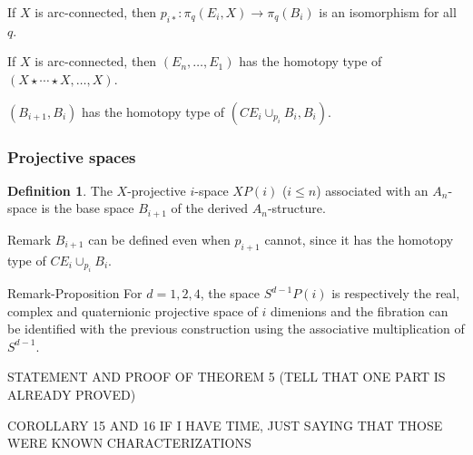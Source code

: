 \documentclass{beamer}
\theoremstyle{definition}
\newtheorem{defi}{Definition}
\begin{document}
\begin{frame}
\begin{theorem}
If $X$ is arc-connected, then $p_{i*}:\pi_q(E_i,X)\to \pi_q(B_i)$ is an isomorphism for all $q$. %
\end{theorem}\pause

\begin{theorem}
If $X$ is arc-connected, then $(E_n, \dots, E_1)$ has the homotopy type of $(X\star\cdots\star X,\dots, X)$. %
\end{theorem}\pause

\begin{theorem}
$(B_{i+1},B_i)$ has the homotopy type of $(CE_i\cup_{p_i}B_i,B_i)$. %
\end{theorem}
\end{frame}
\begin{frame}
\frametitle{Projective spaces}
\begin{defi}
The $X$-projective $i$-space $XP(i)$ ($i\leq n$) associated with an $A_n$-space is the base space $B_{i+1}$ of the derived $A_n$-structure.
\end{defi}\pause
\begin{block}{Remark}
$B_{i+1}$ can be defined even when $p_{i+1}$ cannot, since it has the homotopy type of $CE_i\cup_{p_i}B_i$.
\end{block}\pause
\begin{block}{Remark-Proposition}%
For $d=1,2,4$, the space $S^{d-1}P(i)$ is respectively the real, complex and quaternionic projective space of $i$ dimenions and the fibration can be identified with the previous construction using the associative multiplication of $S^{d-1}$.
\end{block}
\end{frame}


\begin{frame}
STATEMENT AND PROOF OF THEOREM 5 (TELL THAT ONE PART IS ALREADY PROVED)
\end{frame}




\begin{frame}
COROLLARY 15 AND 16 IF I HAVE TIME, JUST SAYING THAT THOSE WERE KNOWN CHARACTERIZATIONS
\end{frame}
\end{document}
